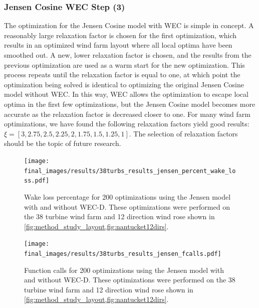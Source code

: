 \documentclass[a4paper]{jpconf}
\begin{document}
\subsubsection{Jensen Cosine WEC Step (3)}

The optimization for the Jensen Cosine model with WEC is simple in concept. A reasonably large relaxation factor is chosen for the first optimization, which results in an optimized wind farm layout where all local optima have been smoothed out. A new, lower relaxation factor is chosen, and the results from the previous optimization are used as a warm start for the new optimization. This process repeats until the relaxation factor is equal to one, at which point the optimization being solved is identical to optimizing the original Jensen Cosine model without WEC. In this way, WEC allows the optimization to escape local optima in the first few optimizations, but the Jensen Cosine model becomes more accurate as the relaxation factor is decreased closer to one. For many wind farm optimizations, we have found the following relaxation factors yield good results: $\xi = [3, 2.75, 2.5, 2.25, 2, 1.75, 1.5, 1.25, 1]$. The selection of relaxation factors should be the topic of future research.


\begin{figure}[h!]  
	\centering
	\begin{minipage}[t]{18pc}    
		\centering
		\texttt{[image: final\_images/results/38turbs\_results\_jensen\_percent\_wake\_loss.pdf]}
		\caption{Wake loss percentage for 200 optimizations using the Jensen model with and without WEC-D. These optimizations were performed on the 38 turbine wind farm and 12 direction wind rose shown in \cref{fig:method_study_layout,fig:nantucket12dirs}.}
		\label{fig:jensen-38-wake-loss}
	\end{minipage}\hspace{1pc}
	\begin{minipage}[t]{18pc}    
		\centering
		\texttt{[image: final\_images/results/38turbs\_results\_jensen\_fcalls.pdf]}
		\caption{Function calls for 200 optimizations using the Jensen model with and without WEC-D. These optimizations were performed on the 38 turbine wind farm and 12 direction wind rose shown in \cref{fig:method_study_layout,fig:nantucket12dirs}.}
		\label{fig:jensen-38-wake-fcalls}
	\end{minipage}
\end{figure}
\end{document}
